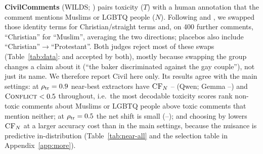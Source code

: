 \textbf{CivilComments} (WILDS; \citealp{borkan2019nuanced,koh2021wilds}) pairs toxicity ($T$) with a human annotation that the comment mentions Muslims or LGBTQ people ($N$). Following \citet{dixon2018measuring} and \citet{garg2019counterfactual}, we swapped those identity terms for Christian/straight terms and, on 400 further comments, ``Christian'' for ``Muslim'', averaging the two directions; placebos also include ``Christian''$\to$``Protestant''. Both judges reject most of these swaps (Table~\ref{tab:data}: \civilAccFwd{} and \civilAccRev{} accepted by both), mostly because swapping the group changes a claim about it (``the baker discriminated against the gay couple''), not just its name. We therefore report Civil here only. Its results agree with the main settings: at $\rho_{\text{tr}}=0.9$ near-best extractors have $\textsc{CF}_{N}$ \nbCFmincivilQNine--\nbCFmaxcivilQNine{} (Qwen; Gemma \nbCFmincivilGNine--\nbCFmaxcivilGNine) and $\textsc{Conflict}{}<0.5$ throughout, i.e.\ the most decodable toxicity scores rank non-toxic comments about Muslims or LGBTQ people above toxic comments that mention neither; at $\rho_{\text{tr}}=0.5$ the net shift is small (\nbCFmincivilQFive--\nbCFmaxcivilQFive); and choosing by \conf{} lowers $\textsc{CF}_{N}$ at a larger accuracy cost than in the main settings, because the nuisance is predictive in-distribution (Table~\ref{tab:near-all} and the selection table in Appendix~\ref{app:more}).

\begin{table}[h]
\centering\small\setlength{\tabcolsep}{2pt}
\resizebox{\columnwidth}{!}{}
\caption{As Table~\ref{tab:near}, all settings including Civil (accepted edits; Civil: mean of both swap directions).}
\label{tab:near-all}
\end{table}
